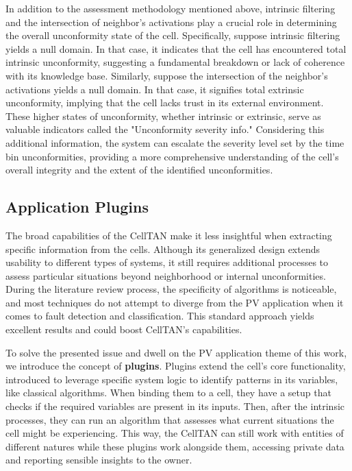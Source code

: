 In addition to the assessment methodology mentioned above, intrinsic filtering and the intersection of neighbor's activations play a crucial role in determining the overall unconformity state of the cell. Specifically, suppose intrinsic filtering yields a null domain. In that case, it indicates that the cell has encountered total intrinsic unconformity, suggesting a fundamental breakdown or lack of coherence with its knowledge base. Similarly, suppose the intersection of the neighbor's activations yields a null domain. In that case, it signifies total extrinsic unconformity, implying that the cell lacks trust in its external environment. These higher states of unconformity, whether intrinsic or extrinsic, serve as valuable indicators called the "Unconformity severity info." Considering this additional information, the system can escalate the severity level set by the time bin unconformities, providing a more comprehensive understanding of the cell's overall integrity and the extent of the identified unconformities.


\subsection{Application Plugins} \label{subsec:plugins}


The broad capabilities of the CellTAN make it less insightful when extracting specific information from the cells. Although its generalized design extends usability to different types of systems, it still requires additional processes to assess particular situations beyond neighborhood or internal unconformities. During the literature review process, the specificity of algorithms is noticeable, and most techniques do not attempt to diverge from the PV application when it comes to fault detection and classification. This standard approach yields excellent results and could boost CellTAN's capabilities.

To solve the presented issue and dwell on the PV application theme of this work, we introduce the concept of \textbf{plugins}. Plugins extend the cell's core functionality, introduced to leverage specific system logic to identify patterns in its variables, like classical algorithms. When binding them to a cell, they have a setup that checks if the required variables are present in its inputs. Then, after the intrinsic processes, they can run an algorithm that assesses what current situations the cell might be experiencing. This way, the CellTAN can still work with entities of different natures while these plugins work alongside them, accessing private data and reporting sensible insights to the owner. 

